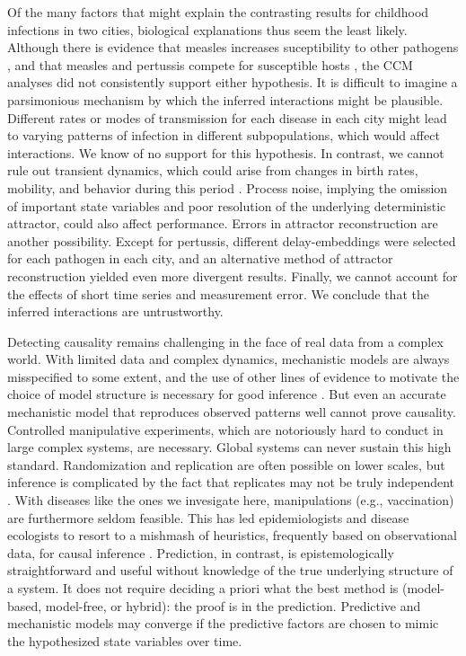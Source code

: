 Of the many factors that might explain the contrasting results for childhood infections in two cities, biological explanations thus seem the least likely. 
Although there is evidence that measles increases suceptibility to other pathogens \cite{Mina2015}, and that measles and pertussis compete for susceptible hosts \cite{Rohani2003}, the CCM analyses did not consistently support either hypothesis. 
It is difficult to imagine a parsimonious mechanism by which the inferred interactions might be plausible.
Different rates or modes of transmission for each disease in each city might lead to varying patterns of infection in different subpopulations, which would affect interactions.
We know of no support for this hypothesis.
In contrast, we cannot rule out transient dynamics, which could arise from changes in birth rates, mobility, and behavior during this period \cite{Earn2000}.
Process noise, implying the omission of important state variables and poor resolution of the underlying deterministic attractor, could also affect performance. 
Errors in attractor reconstruction are another possibility. 
Except for pertussis, different delay-embeddings were selected for each pathogen in each city, and an alternative method of attractor reconstruction yielded even more divergent results. 
Finally, we cannot account for the effects of short time series and measurement error.
We conclude that the inferred interactions are untrustworthy.

Detecting causality remains challenging in the face of real data from a complex world.
With limited data and complex dynamics, mechanistic models are always misspecified to some extent, and the use of other lines of evidence to motivate the choice of model structure is necessary for good inference \cite{BurnhamAnderson, He2009, Yodzis1988, Wood1999, Grad2012}.
But even an accurate mechanistic model that reproduces observed patterns well cannot prove causality. 
Controlled manipulative experiments, which are notoriously hard to conduct in large complex systems, are necessary.
Global systems can never sustain this high standard.  
Randomization and replication are often possible on lower scales, but inference is complicated by the fact that replicates may not be truly independent \cite{Simberloff1969, Hurlbert1984, Tilman1989}.
With diseases like the ones we invesigate here, manipulations (e.g., vaccination) are furthermore seldom feasible. 
This has led epidemiologists and disease ecologists to resort to a mishmash of heuristics, frequently based on observational data, for causal inference \cite{Plowright2008}.
Prediction, in contrast, is epistemologically straightforward and useful without knowledge of the true underlying structure of a system. 
It does not require deciding a priori what the best method is (model-based, model-free, or hybrid): the proof is in the prediction.
Predictive and mechanistic models may converge if the predictive factors are chosen to mimic the hypothesized state variables over time.

